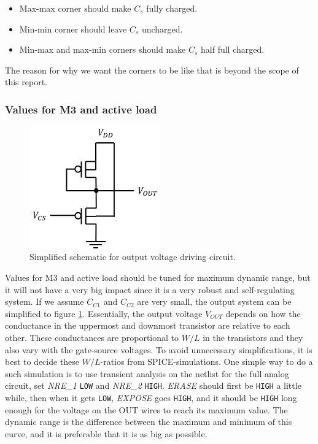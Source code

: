\begin{itemize}
    \item Max-max corner should make $C_s$ fully charged.
    \item Min-min corner should leave $C_s$ uncharged.
    \item Min-max and max-min corners should make $C_s$ half full charged.
\end{itemize}

The reason for why we want the corners to be like that is beyond the scope of this report.

\subsubsection{Values for M3 and active load}

\begin{figure}[H]
    \centering
    \includegraphics[width=0.5\textwidth]{graphs/m3AndActiveLoad.png}
    \caption{Simplified schematic for output voltage driving circuit.}
    \label{fig:m3AndActiveLoad}
\end{figure}

Values for M3 and active load should be tuned for maximum dynamic range, but it will not have a very big impact since it is a very robust and self-regulating system. If we assume $C_{C1}$ and $C_{C2}$ are very small, the output system can be simplified to figure \ref{fig:m3AndActiveLoad}. Essentially, the output voltage $V_{OUT}$ depends on how the conductance in the uppermost and downmost transistor are relative to each other. These conductances are proportional to $W/L$ in the transistors and they also vary with the gate-source voltages. To avoid unnecessary simplifications, it is best to decide these $W/L$-ratios from SPICE-simulations. One simple way to do a such simulation is to use transient analysis on the netlist for the full analog circuit, set \emph{NRE\_1} \verb|LOW| and \emph{NRE\_2} \verb|HIGH|. \emph{ERASE} should first be \verb|HIGH| a little while, then when it gets \verb|LOW|, \emph{EXPOSE} goes \verb|HIGH|, and it should be \verb|HIGH| long enough for the voltage on the OUT wires to reach its maximum value. The dynamic range is the difference between the maximum and minimum of this curve, and it is preferable that it is as big as possible.

